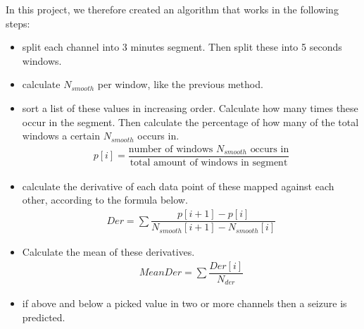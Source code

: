 In this project, we therefore created an algorithm that works in the following steps:
\begin{itemize}
    \item split each channel into 3 minutes segment. Then split these into 5 seconds windows.
    \item calculate $N_{smooth}$ per window, like the previous method.
    \item sort a list of these values in increasing order. Calculate how many times these occur in the segment. Then calculate the percentage of how many of the total windows a certain $N_{smooth}$ occurs in.
    \begin{align}
        p[i] = \dfrac{\text{number of windows $N_{smooth}$ occurs in}}{\text{total amount of windows in segment}}
    \end{align}
    \item calculate the derivative of each data point of these mapped against each other, according to the formula below.
    \begin{align}
    Der = \sum \dfrac{{p[i+1]-p[i]}}{{N_{smooth}[i+1]-N_{smooth}[i]}}
    \end{align}
    \item Calculate the mean of these derivatives.
    \begin{align}
        MeanDer = \sum \dfrac{Der[i]}{N_{der}}
    \end{align}
    \item if above and below a picked value in two or more channels then a seizure is predicted.
\end{itemize}







